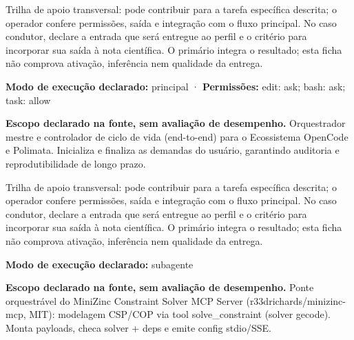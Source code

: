 \begin{funcao}
Trilha de apoio transversal: pode contribuir para a tarefa específica descrita; o operador confere permissões, saída e integração com o fluxo principal. No caso condutor, declare a entrada que será entregue ao perfil e o critério para incorporar sua saída à nota científica. O primário integra o resultado; esta ficha não comprova ativação, inferência nem qualidade da entrega.
\end{funcao}

\begin{arquitetura}
\textbf{Modo de execução declarado:} principal · \textbf{Permissões:} edit: ask; bash: ask; task: allow
\end{arquitetura}


\begin{descricao}
\textbf{Escopo declarado na fonte, sem avaliação de desempenho.}
Orquestrador mestre e controlador de ciclo de vida (end-to-end) para o Ecossistema OpenCode e Polimata. Inicializa e finaliza as demandas do usuário, garantindo auditoria e reprodutibilidade de longo prazo.
\end{descricao}

\begin{funcao}
Trilha de apoio transversal: pode contribuir para a tarefa específica descrita; o operador confere permissões, saída e integração com o fluxo principal. No caso condutor, declare a entrada que será entregue ao perfil e o critério para incorporar sua saída à nota científica. O primário integra o resultado; esta ficha não comprova ativação, inferência nem qualidade da entrega.
\end{funcao}

\begin{arquitetura}
\textbf{Modo de execução declarado:} subagente
\end{arquitetura}


\begin{descricao}
\textbf{Escopo declarado na fonte, sem avaliação de desempenho.}
Ponte orquestrável do MiniZinc Constraint Solver MCP Server (r33drichards/minizinc-mcp, MIT): modelagem CSP/COP via tool solve\_constraint (solver gecode). Monta payloads, checa solver + deps e emite config stdio/SSE.
\end{descricao}


